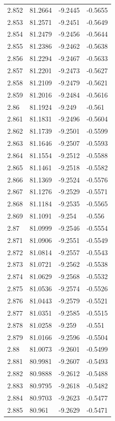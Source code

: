 \begin{tabular}{llll}
2.852 & 81.2664 & -9.2445 & -0.5655 \\
2.853 & 81.2571 & -9.2451 & -0.5649 \\
2.854 & 81.2479 & -9.2456 & -0.5644 \\
2.855 & 81.2386 & -9.2462 & -0.5638 \\
2.856 & 81.2294 & -9.2467 & -0.5633 \\
2.857 & 81.2201 & -9.2473 & -0.5627 \\
2.858 & 81.2109 & -9.2479 & -0.5621 \\
2.859 & 81.2016 & -9.2484 & -0.5616 \\
2.86 & 81.1924 & -9.249 & -0.561 \\
2.861 & 81.1831 & -9.2496 & -0.5604 \\
2.862 & 81.1739 & -9.2501 & -0.5599 \\
2.863 & 81.1646 & -9.2507 & -0.5593 \\
2.864 & 81.1554 & -9.2512 & -0.5588 \\
2.865 & 81.1461 & -9.2518 & -0.5582 \\
2.866 & 81.1369 & -9.2524 & -0.5576 \\
2.867 & 81.1276 & -9.2529 & -0.5571 \\
2.868 & 81.1184 & -9.2535 & -0.5565 \\
2.869 & 81.1091 & -9.254 & -0.556 \\
2.87 & 81.0999 & -9.2546 & -0.5554 \\
2.871 & 81.0906 & -9.2551 & -0.5549 \\
2.872 & 81.0814 & -9.2557 & -0.5543 \\
2.873 & 81.0721 & -9.2562 & -0.5538 \\
2.874 & 81.0629 & -9.2568 & -0.5532 \\
2.875 & 81.0536 & -9.2574 & -0.5526 \\
2.876 & 81.0443 & -9.2579 & -0.5521 \\
2.877 & 81.0351 & -9.2585 & -0.5515 \\
2.878 & 81.0258 & -9.259 & -0.551 \\
2.879 & 81.0166 & -9.2596 & -0.5504 \\
2.88 & 81.0073 & -9.2601 & -0.5499 \\
2.881 & 80.9981 & -9.2607 & -0.5493 \\
2.882 & 80.9888 & -9.2612 & -0.5488 \\
2.883 & 80.9795 & -9.2618 & -0.5482 \\
2.884 & 80.9703 & -9.2623 & -0.5477 \\
2.885 & 80.961 & -9.2629 & -0.5471 \\

\end{tabular}
